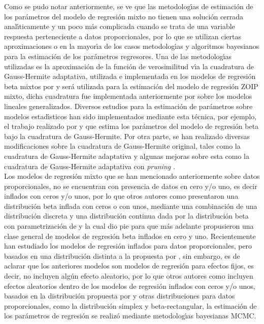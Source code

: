 Como se pudo notar anteriormente, se ve que las metodolog\'{\i}as de estimaci\'{o}n de los par\'{a}metros del modelo de regresi\'{o}n mixto no tienen una soluci\'{o}n cerrada anal\'{\i}ticamente y un poco m\'{a}s complicada cuando se trata de una variable respuesta perteneciente a datos proporcionales, por lo que se utilizan ciertas aproximaciones o en la mayor\'{\i}a de los casos metodolog\'{\i}as y algoritmos bayesianos para la estimaci\'{o}n de los par\'{a}metros regresores. Una de las metodolog\'{\i}as utilizadas es la aproximaci\'{o}n de la funci\'{o}n de verosimilitud v\'{\i}a la cuadratura de Gauss-Hermite adaptativa, utilizada e implementada en los modelos de regresi\'{o}n beta mixtos por \cite{Usuga1} y ser\'{a} utilizada para la estimaci\'{o}n del modelo de regresi\'{o}n ZOIP mixto, dicha cuadratura fue implementada anteriormente por \cite{Fahrmeir1} sobre los modelos lineales generalizados. Diversos estudios para la estimaci\'{o}n de par\'{a}metros sobre modelos estad\'{\i}sticos han sido implementados mediante esta t\'{e}cnica, por ejemplo, el trabajo realizado por \cite{Liu1} y \cite{Smithson1} que estima los par\'{a}metros del modelo de regresi\'{o}n beta bajo la cuadratura de Gauss-Hermite. Por otra parte, se han realizado diversas modificaciones sobre la cuadratura de Gauss-Hermite original, tales como la cuadratura de Gauss-Hermite adaptativa y algunas mejoras sobre esta como la cuadratura de Gauss-Hermite adaptativa con \textit{pruning} \citep{Hernandez1}.\\

Los modelos de regresi\'{o}n mixto que se han mencionado anteriormente sobre datos proporcionales, no se encuentran con presencia de datos en cero y/o uno, es decir inflados con ceros y/o unos, por lo que otros autores como \cite{Ospina2} presentaron una distribuci\'{o}n beta inflada con ceros o con unos, mediante una combinaci\'{o}n de una distribuci\'{o}n discreta y una distribuci\'{o}n continua dada por la distribuci\'{o}n beta con parametrizaci\'{o}n de \cite{Ferrari2} y la cual dio pie para que m\'{a}s adelante \cite{Ospina1} propusieron una clase general de modelos de regresi\'{o}n beta inflados en cero y uno. Recientemente \cite{Kosmidis1} han estudiado los modelos de regresi\'{o}n inflados para datos proporcionales, pero basados en una distribuci\'{o}n distinta a la propuesta por \cite{Ospina1}, sin embargo, es de aclarar que los anteriores modelos son modelos de regresi\'{o}n para efectos fijos, es decir, no incluyen alg\'{u}n efecto aleatorio, por lo que otros autores como \cite{Galvis1} incluyen efectos aleatorios dentro de los modelos de regresi\'{o}n inflados con ceros y/o unos, basados en la distribuci\'{o}n propuesta por \cite{Ospina2}y otras distribuciones para datos proporcionales, como la distribuci\'{o}n simplex y beta-rectangular, la estimaci\'{o}n de los par\'{a}metros de regresi\'{o}n se realiz\'{o} mediante metodolog\'{\i}as bayesianas MCMC.\\

